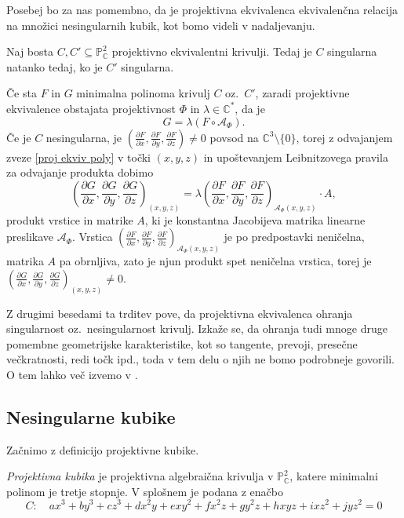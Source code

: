 \documentclass[mat1]{fmfdelo}
\numberwithin{equation}{section}
\newcommand{\C}{\mathbb C}
\newcommand{\CM}{\mathbb C ^*}
\newcommand{\PC}{\mathbb{P}^2_\C}
\newcommand{\pdv}[2][]{\frac{\partial#1}{\partial#2}}
\newcommand{\oz}{oz.\ }
\theoremstyle{definition}
\begin{document}
Posebej bo za nas pomembno, da je projektivna ekvivalenca ekvivalenčna relacija na množici nesingularnih kubik, kot bomo videli v nadaljevanju. 

\begin{trditev}
    Naj bosta $C, C' \subseteq \PC$ projektivno ekvivalentni krivulji. Tedaj je $C$ singularna natanko tedaj, ko je $C'$ singularna. 
\end{trditev}

\begin{dokaz}
    Če sta $F$ in $G$ minimalna polinoma krivulj $C$ oz.\ $C'$, zaradi projektivne ekvivalence obstajata projektivnost $\Phi$ in $\lambda \in \CM$, da je
    \begin{equation}
        \label{proj ekviv poly}
        G = \lambda (F \circ \mathcal{A}_\Phi).
    \end{equation}
    Če je $C$ nesingularna, je $\left(\pdv[F]{x}{}, \pdv[F]{y}{}, \pdv[F]{z}{}\right) \neq 0$ povsod na $\C^3\setminus\{0\}$, torej z odvajanjem zveze \ref{proj ekviv poly} v točki $(x,y,z)$ in upoštevanjem Leibnitzovega pravila za odvajanje produkta dobimo
    \[
        \left(\pdv[G]{x}{}, \pdv[G]{y}{}, \pdv[G]{z}{}\right)_{(x,y,z)} = 
        \lambda \left(\pdv[F]{x}{}, \pdv[F]{y}{}, \pdv[F]{z}{}\right)_{\mathcal{A}_\Phi (x,y,z)} \cdot A,
    \]
    produkt vrstice in matrike $A$, ki je konstantna Jacobijeva matrika linearne preslikave $\mathcal{A}_\Phi$. Vrstica $\left(\pdv[F]{x}{}, \pdv[F]{y}{}, \pdv[F]{z}{}\right)_{\mathcal{A}_\Phi (x,y,z)}$ je po predpostavki neničelna, matrika $A$ pa obrnljiva, zato je njun produkt spet neničelna vrstica, torej je $\left(\pdv[G]{x}{}, \pdv[G]{y}{}, \pdv[G]{z}{}\right)_{(x,y,z)} \neq 0$. 
\end{dokaz}

Z drugimi besedami ta trditev pove, da projektivna ekvivalenca ohranja singularnost \oz nesingularnost krivulj. Izkaže se, da ohranja tudi mnoge druge pomembne geometrijske karakteristike, kot so tangente, prevoji, presečne večkratnosti, redi točk ipd., toda v tem delu o njih ne bomo podrobneje govorili. O tem lahko več izvemo v \cite{Gibson}.


\subsection{Nesingularne kubike}\label{nesingularne kubike}
Začnimo z definicijo projektivne kubike. 

\begin{definicija}
    \emph{Projektivna kubika} je projektivna algebraična krivulja v $\PC$, katere minimalni polinom je tretje stopnje. 
    V splošnem je podana z enačbo
    \[
        C: \quad ax^3 + by^3 + cz^3 + dx^2y + exy^2 + fx^2z + gy^2z + hxyz + ixz^2 + jyz^2 = 0
    \]
\end{definicija}
\end{document}
